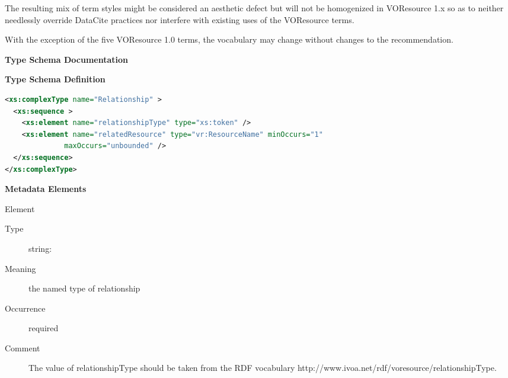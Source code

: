 \documentclass[11pt,a4paper]{ivoa}
\begin{document}
The resulting mix of term styles might be considered an aesthetic defect
but will not be homogenized in VOResource 1.x so as to neither
needlessly override DataCite practices nor interfere with existing uses
of the VOResource terms.

With the exception of the five VOResource 1.0 terms, the vocabulary may
change without changes to the recommendation.

\begin{generated}
\begingroup
      	\renewcommand*\descriptionlabel[1]{%
      	\hbox to 5.5em{\emph{#1}\hfil}}\vspace{2ex}\noindent\textbf{ Type Schema Documentation}


\vspace{1ex}\noindent\textbf{ Type Schema Definition}

\begin{lstlisting}[language=XML,basicstyle=\footnotesize]
<xs:complexType name="Relationship" >
  <xs:sequence >
    <xs:element name="relationshipType" type="xs:token" />
    <xs:element name="relatedResource" type="vr:ResourceName" minOccurs="1"
              maxOccurs="unbounded" />
  </xs:sequence>
</xs:complexType>
\end{lstlisting}

\vspace{0.5ex}\noindent\textbf{ Metadata Elements}

\begingroup\small\begin{bigdescription}\item[Element \xmlel{relationshipType}]
\begin{description}
\item[Type] string: 
\item[Meaning] 
                  the named type of relationship
               
\item[Occurrence] required
\item[Comment] 
                 The value  of relationshipType should be taken from the RDF
                 vocabulary
                 http://www.ivoa.net/rdf/voresource/relationshipType.
               


\end{description}
\end{bigdescription}
\end{generated}
\end{document}
